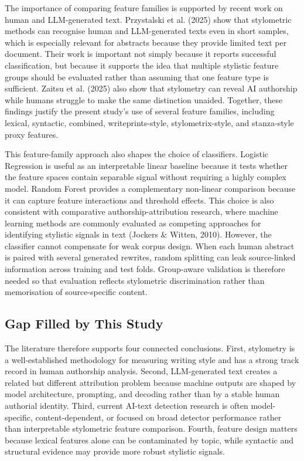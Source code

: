\documentclass[12pt,a4paper]{article}
\begin{document}
The importance of comparing feature families is supported by recent work on human and LLM-generated text. Przystalski et al. (2025) show that stylometric methods can recognise human and LLM-generated texts even in short samples, which is especially relevant for abstracts because they provide limited text per document. Their work is important not simply because it reports successful classification, but because it supports the idea that multiple stylistic feature groups should be evaluated rather than assuming that one feature type is sufficient. Zaitsu et al. (2025) also show that stylometry can reveal AI authorship while humans struggle to make the same distinction unaided. Together, these findings justify the present study's use of several feature families, including lexical, syntactic, combined, writeprints-style, stylometrix-style, and stanza-style proxy features.

This feature-family approach also shapes the choice of classifiers. Logistic Regression is useful as an interpretable linear baseline because it tests whether the feature spaces contain separable signal without requiring a highly complex model. Random Forest provides a complementary non-linear comparison because it can capture feature interactions and threshold effects. This choice is also consistent with comparative authorship-attribution research, where machine learning methods are commonly evaluated as competing approaches for identifying stylistic signals in text (Jockers \& Witten, 2010). However, the classifier cannot compensate for weak corpus design. When each human abstract is paired with several generated rewrites, random splitting can leak source-linked information across training and test folds. Group-aware validation is therefore needed so that evaluation reflects stylometric discrimination rather than memorisation of source-specific content.

\subsection{Gap Filled by This Study}

The literature therefore supports four connected conclusions. First, stylometry is a well-established methodology for measuring writing style and has a strong track record in human authorship analysis. Second, LLM-generated text creates a related but different attribution problem because machine outputs are shaped by model architecture, prompting, and decoding rather than by a stable human authorial identity. Third, current AI-text detection research is often model-specific, content-dependent, or focused on broad detector performance rather than interpretable stylometric feature comparison. Fourth, feature design matters because lexical features alone can be contaminated by topic, while syntactic and structural evidence may provide more robust stylistic signals.
\end{document}
